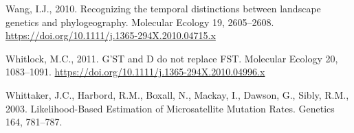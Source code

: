 \documentclass[12pt,a4paper,]{report}
\begin{document}
\leavevmode\hypertarget{ref-Wang2010a}{}%
Wang, I.J., 2010. Recognizing the temporal distinctions between
landscape genetics and phylogeography. Molecular Ecology 19, 2605--2608.
\url{https://doi.org/10.1111/j.1365-294X.2010.04715.x}

\leavevmode\hypertarget{ref-whitlock_gst_2011}{}%
Whitlock, M.C., 2011. G'ST and D do not replace FST. Molecular Ecology
20, 1083--1091. \url{https://doi.org/10.1111/j.1365-294X.2010.04996.x}

\leavevmode\hypertarget{ref-whittaker_likelihood-based_2003}{}%
Whittaker, J.C., Harbord, R.M., Boxall, N., Mackay, I., Dawson, G.,
Sibly, R.M., 2003. Likelihood-Based Estimation of Microsatellite
Mutation Rates. Genetics 164, 781--787.
\end{document}
